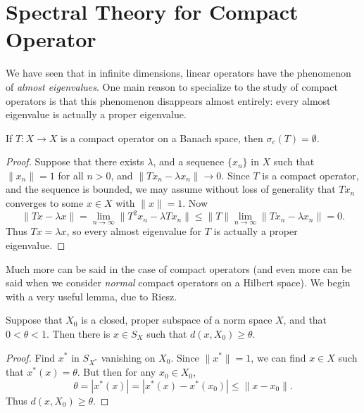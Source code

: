 \section{Spectral Theory for Compact Operator}

We have seen that in infinite dimensions, linear operators have the phenomenon of \emph{almost eigenvalues}. One main reason to specialize to the study of compact operators is that this phenomenon disappears almost entirely: every almost eigenvalue is actually a proper eigenvalue.

\begin{lemma}
    If $T: X \to X$ is a compact operator on a Banach space, then $\sigma_c(T) = \emptyset$.
\end{lemma}
\begin{proof}
    Suppose that there exists $\lambda$, and a sequence $\{ x_n \}$ in $X$ such that $\| x_n \| = 1$ for all $n > 0$, and $\| Tx_n - \lambda x_n \| \to 0$. Since $T$ is a compact operator, and the sequence is bounded, we may assume without loss of generality that $Tx_n$ converges to some $x \in X$ with $\| x \| = 1$. Now
    \[ \| Tx - \lambda x \| = \lim_{n \to \infty} \| T^2 x_n - \lambda T x_n \| \leq \| T \| \lim_{n \to \infty} \| Tx_n - \lambda x_n \| = 0. \]
    Thus $Tx = \lambda x$, so every almost eigenvalue for $T$ is actually a proper eigenvalue.
\end{proof}

Much more can be said in the case of compact operators (and even more can be said when we consider \emph{normal} compact operators on a Hilbert space). We begin with a very useful lemma, due to Riesz.

\begin{lemma}
    Suppose that $X_0$ is a closed, proper subspace of a norm space $X$, and that $0 < \theta < 1$. Then there is $x \in S_X$ such that $d(x,X_0) \geq \theta$.
\end{lemma}
\begin{proof}
    Find $x^*$ in $S_{X^*}$ vanishing on $X_0$. Since $\| x^* \| = 1$, we can find $x \in X$ such that $x^*(x) = \theta$. But then for any $x_0 \in X_0$,
    \[ \theta = |x^*(x)| = |x^*(x) - x^*(x_0)| \leq \| x - x_0 \|. \]
    Thus $d(x,X_0) \geq \theta$.
\end{proof}

